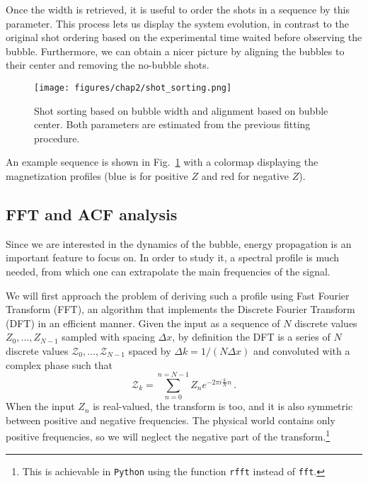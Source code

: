 Once the width is retrieved, it is useful to order the shots in a sequence by this parameter. This process lets us display the system evolution, in contrast to the original shot ordering based on the experimental time waited before observing the bubble. Furthermore, we can obtain a nicer picture by aligning the bubbles to their center and removing the no-bubble shots.
\begin{figure}[t!]
    \centering
    \texttt{[image: figures/chap2/shot\_sorting.png]}
    \caption{Shot sorting based on bubble width and alignment based on bubble center. Both parameters are estimated from the previous fitting procedure.}
    \label{fig:sorting}
\end{figure}
An example sequence is shown in Fig.\ \ref{fig:sorting} with a colormap displaying the magnetization profiles (blue is for positive $Z$ and red for negative $Z$).

\subsection{FFT and ACF analysis}
Since we are interested in the dynamics of the bubble, energy propagation is an important feature to focus on. In order to study it, a spectral profile is much needed, from which one can extrapolate the main frequencies of the signal. 

We will first approach the problem of deriving such a profile using Fast Fourier Transform (FFT), an algorithm that implements the Discrete Fourier Transform (DFT) in an efficient manner. Given the input as a sequence of $N$ discrete values $Z_0,\dots,Z_{N-1}$ sampled with spacing $\Delta x$, by definition the DFT is a series of $N$ discrete values $\mathcal{Z}_0,\dots,\mathcal{Z}_{N-1}$ spaced by $\Delta k = 1/(N\Delta x)$ and convoluted with a complex phase such that
\begin{equation*}
    \mathcal{Z}_k = \sum_{n=0}^{n=N-1} Z_n e^{-2\pi i \frac{k}{N}n}\, .
\end{equation*}
When the input $Z_n$ is real-valued, the transform is too, and it is also symmetric between positive and negative frequencies. The physical world contains only positive frequencies, so we will neglect the negative part of the transform.\footnote{This is achievable in \texttt{Python} using the function \texttt{rfft} instead of \texttt{fft}.}

